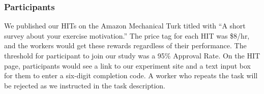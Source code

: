 

\subsubsection{Participants}
We published our HITs on the Amazon Mechanical Turk titled with ``A short survey about your exercise motivation.'' The price tag for each HIT was \$8/hr, and the workers would get these rewards regardless of their performance. The threshold for participant to join our study was a 95\% Approval Rate. On the HIT page, participants would see a link to our experiment site and a text input box for them to enter a six-digit completion code. A worker who repeats the task will be rejected as we instructed in the task description.

